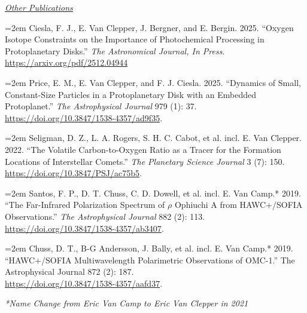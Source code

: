 \documentclass[11pt]{article}
\newcommand{\link}[1]{{\color{blue}\href{#1}{#1}}}
\begin{document}
\vspace{0.5em}
\noindent\textit{\underline{Other Publications}}

\noindent
\hangindent=2em
Ciesla, F. J., E. Van Clepper, J. Bergner, and E. Bergin. 2025. ``Oxygen Isotope
Constraints on the Importance of Photochemical Processing in Protoplanetary
Disks.'' \textit{The Astronomical Journal, In Press}.
\link{https://arxiv.org/pdf/2512.04944}

\noindent
\hangindent=2em
Price, E. M., E. Van Clepper, and F. J. Ciesla. 2025. “Dynamics of Small,
Constant-Size Particles in a Protoplanetary Disk with an Embedded Protoplanet.”
\textit{The Astrophysical Journal} 979 (1): 37.
\link{https://doi.org/10.3847/1538-4357/ad9f35}.

\noindent
\hangindent=2em
Seligman, D. Z., L. A. Rogers, S. H. C. Cabot, et al. incl. E. Van Clepper. 2022. “The
Volatile Carbon-to-Oxygen Ratio as a Tracer for the Formation Locations of
Interstellar Comets.” \textit{The Planetary Science Journal} 3 (7): 150.
\link{https://doi.org/10.3847/PSJ/ac75b5}.

\pagebreak

\noindent
\hangindent=2em
Santos, F. P., D. T. Chuss, C. D. Dowell, et al. incl. E. Van Camp.* 2019. “The
Far-Infrared Polarization Spectrum of $\rho$ Ophiuchi A from HAWC+/SOFIA
Observations.” \textit{The Astrophysical Journal} 882 (2): 113.
\link{https://doi.org/10.3847/1538-4357/ab3407}.

\noindent
\hangindent=2em
Chuss, D. T., B-G Andersson, J. Bally, et al. incl. E. Van Camp.* 2019. “HAWC+/SOFIA
Multiwavelength Polarimetric Observations of OMC-1.” The Astrophysical Journal
872 (2): 187. \\
\link{https://doi.org/10.3847/1538-4357/aafd37}.

\noindent\textit{*Name Change from Eric Van Camp to Eric Van Clepper in 2021}


\end{document}
